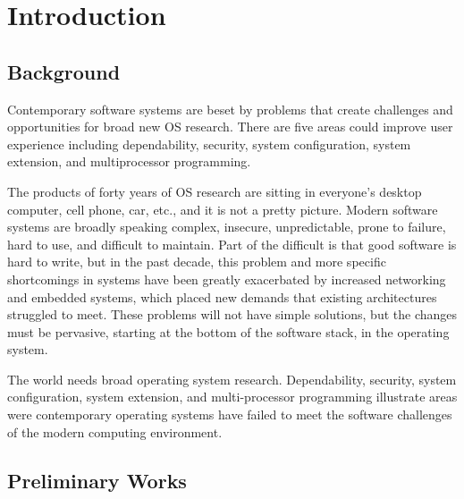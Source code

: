 \documentclass{swfcthesis}
\begin{document}

\makepreliminarypages%
\frontmatter          
\tableofcontents     %
\listoffigures       %
\listoftables        %
\listoftodos

\mainmatter

\chapter{Introduction}

\section{Background}
\label{sec:background}

\par Contemporary software systems are beset by problems that create challenges and
opportunities for broad new OS research. There are five areas could improve user
experience including dependability, security, system configuration, system extension, and
multiprocessor programming.

\par The products of forty years of OS research are sitting in everyone's desktop
computer, cell phone, car, etc., and it is not a pretty picture.
Modern software systems are broadly speaking complex, insecure, unpredictable, prone to
failure, hard to use, and difficult to maintain. Part of the difficult is that good
software is hard to write, but in the past decade, this problem and more specific
shortcomings in systems have been greatly exacerbated by increased networking and embedded
systems, which placed new demands that existing architectures struggled to meet. These
problems will not have simple solutions, but the changes must be pervasive, starting at
the bottom of the software stack, in the operating system.

\par The world needs broad operating system research. Dependability, security, system
configuration, system extension, and multi-processor programming
illustrate areas were contemporary operating systems have failed to meet the software
challenges of the modern computing environment.

\section{Preliminary Works}
\end{document}
